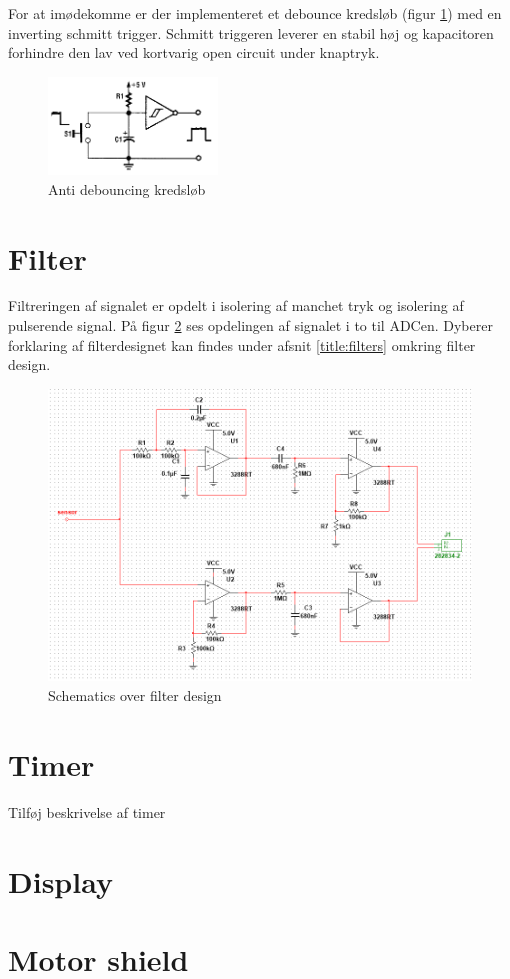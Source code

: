 For at imødekomme  er der implementeret et debounce kredsløb (figur \ref{fig:antidebouncingcircuit}) med en inverting schmitt trigger. Schmitt triggeren leverer en stabil høj og kapacitoren forhindre den lav ved kortvarig open circuit under knaptryk. 
\begin{figure}[H]
	\centering
	\includegraphics[width = 0.4\textwidth]{billeder/debounceSchematic.png}
	\caption{Anti debouncing kredsløb}\label{fig:antidebouncingcircuit}
\end{figure}

\section{Filter}
Filtreringen af signalet er opdelt i isolering af manchet tryk og isolering af pulserende signal. På figur \ref{fig:filterschematics} ses opdelingen af signalet i to til ADCen. Dyberer forklaring af filterdesignet kan findes under afsnit \ref{title:filters} omkring filter design.

\begin{figure}[H]
	\includegraphics[width = \textwidth]{billeder/filterSchematics.png}
	\caption{Schematics over filter design}\label{fig:filterschematics}
\end{figure}

\section{Timer}
Tilføj beskrivelse af timer

\section{Display}

\section{Motor shield}